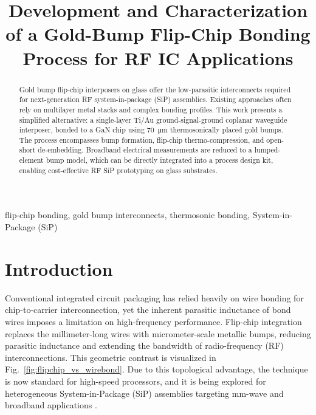 \documentclass[conference]{IEEEtran}
\begin{document}
\title{Development and Characterization of a Gold-Bump Flip-Chip Bonding Process for RF IC Applications
}

\author{
}

\maketitle

\begin{abstract}
Gold bump flip-chip interposers on glass offer the low-parasitic interconnects required for next-generation RF system-in-package (SiP) assemblies. Existing approaches often rely on multilayer metal stacks and complex bonding profiles. This work presents a simplified alternative: a single-layer Ti/Au ground-signal-ground coplanar waveguide interposer, bonded to a GaN chip using \SI{70}{\micro\meter} thermosonically placed gold bumps. The process encompasses bump formation, flip-chip thermo-compression, and open-short de-embedding. Broadband electrical measurements are reduced to a lumped-element bump model, which can be directly integrated into a process design kit, enabling cost-effective RF SiP prototyping on glass substrates.
\end{abstract}

\begin{IEEEkeywords}
flip-chip bonding, gold bump interconnects, thermosonic bonding, System-in-Package (SiP)
\end{IEEEkeywords}

\IEEEpeerreviewmaketitle

\section{Introduction}
Conventional integrated circuit packaging has relied heavily on wire bonding for chip-to-carrier interconnection, yet the inherent parasitic inductance of bond wires imposes a limitation on high-frequency performance. Flip-chip integration replaces the millimeter-long wires with micrometer-scale metallic bumps, reducing parasitic inductance and extending the bandwidth of radio-frequency (RF) interconnections. This geometric contrast is visualized in Fig.~\ref{fig:flipchip_vs_wirebond}. Due to this topological advantage, the technique is now standard for high-speed processors, and it is being explored for heterogeneous System-in-Package (SiP) assemblies targeting mm-wave and broadband applications \cite{Lau2016,Heinrich2005}.
\end{document}
